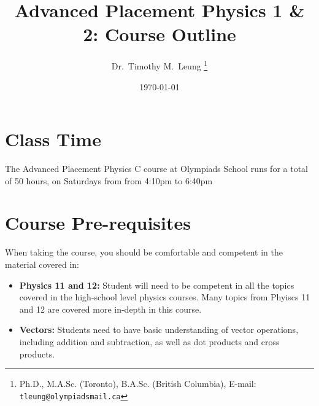 \documentclass{../../oss-handout}
\title{Advanced Placement Physics 1 \& 2: Course Outline}
\author{Dr.\ Timothy M.\ Leung
  \footnote{Ph.D., M.A.Sc. (Toronto), B.A.Sc. (British Columbia), E-mail:
    \texttt{tleung@olympiadsmail.ca}}
}
\date{\today}
\begin{document}
\thispagestyle{title}
\gentitle

\section*{Class Time}
The Advanced Placement Physics C course at Olympiads School runs for a total of
50 hours, on%
Saturdays from  from 4:10pm to 6:40pm

\section*{Course Pre-requisites}
When taking the course, you should be comfortable and competent in the material
covered in:
\begin{itemize}[noitemsep,topsep=0pt,leftmargin=18pt]
\item\textbf{Physics 11 and 12:} Student will need to be competent in all the
  topics covered in the high-school level physics courses. Many topics from
  Phyiscs 11 and 12 are covered more in-depth in this course.
\item\textbf{Vectors:} Students need to have basic understanding of vector
  operations, including addition and subtraction, as well as dot products and
  cross products.
\end{itemize}
\end{document}
